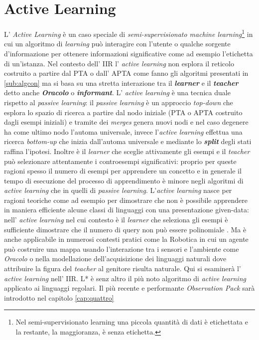 \section{Active Learning}
\label{sec:acl}
L' \textit{Active Learning} è un caso speciale di \textit{semi-supervisionato machine learning}\footnote{Nel semi-supervisionato learning una piccola quantità di dati è etichettata e la restante, la maggioranza, è senza etichetta.} in cui un algoritmo di \textit{learning} può interagire con l'utente o  qualche sorgente d'informazione per ottenere informazioni significative come ad esempio l'etichetta di un'istanza. Nel contesto dell' \ac{IIR} l' \textit{active learning} non esplora il reticolo costruito a partire dal PTA o dall' APTA come fanno gli algoritmi presentati in \ref{sub:algcon}  ma si basa su una stretta interazione tra il \textit{\textbf{learner}} e il \textit{\textbf{teacher}}  detto anche \textit{\textbf{Oracolo}} o \textit{\textbf{informant}}. L' \textit{active learning} è una tecnica duale rispetto al \textit{passive learning}: il \textit{passive learning} è un approccio \textit{top-down} che esplora lo spazio di ricerca a partire dal nodo iniziale (PTA o APTA costruito  dagli esempi iniziali) e tramite dei \textit{merges} genera nuovi nodi e nel caso degenere ha come ultimo nodo l'automa universale, invece l'\textit{active learning} effettua una ricerca \textit{bottom-up} che inizia dall'automa universale e mediante lo \textbf{\textit{split}} degli stati raffina l'ipotesi. Inoltre è il \textit{learner} che sceglie attivamente gli esempi e  il \textit{teacher} può selezionare attentamente i controesempi significativi: proprio per queste ragioni spesso il numero di esempi per apprendere un concetto e in generale il tempo di esecuzione del processo di apprendimento è minore negli algoritmi di \textit{active learning} che in quelli di \textit{passive learning}.   
L'\textit{active learning} nasce per ragioni teoriche come ad esempio per dimostrare che non è possibile apprendere in maniera efficiente alcune classi di linguaggi con una presentazione given-data: nell' \textit{active learning} nel cui contesto è il \textit{learner} che seleziona gli esempi  è sufficiente dimostrare che il numero di query non può essere polinomiale . Ma è anche applicabile in numerosi contesti pratici come la Robotica in cui un agente può costruire una mappa usando l'interazione tra i sensori e l'ambiente come \textit{Oracolo} o nella modellazione dell'acquisizione dei linguaggi naturali dove attribuire la figura del \textit{teacher} al genitore risulta naturale. Qui si esaminerà l' \textit{active learning} nell' \ac{IIR}. L* è senz altro il più noto algoritmo  di \textit{active learning} applicato ai linguaggi regolari. Il più recente e performante \textit{Observation Pack} sarà introdotto nel capitolo \ref{cap:quattro}
